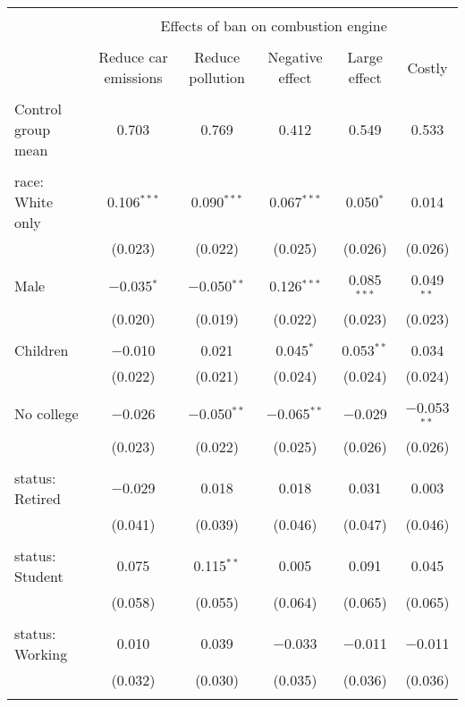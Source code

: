 
\begin{tabular}{@{\extracolsep{5pt}}lccccc} 
\\[-1.8ex]\hline 
\hline \\[-1.8ex] 
 & \multicolumn{5}{c}{Effects of ban on combustion engine} \\ 
\cline{2-6} 
\\[-1.8ex] & Reduce car emissions & Reduce pollution & Negative effect & Large effect & Costly \\ 
\hline \\[-1.8ex] 
 Control group mean & 0.703 & 0.769 & 0.412 & 0.549 & 0.533  \\ \hline \\[-1.8ex] race: White only & 0.106$^{***}$ & 0.090$^{***}$ & 0.067$^{***}$ & 0.050$^{*}$ & 0.014 \\ 
  & (0.023) & (0.022) & (0.025) & (0.026) & (0.026) \\ 
  & & & & & \\ 
 Male & $-$0.035$^{*}$ & $-$0.050$^{**}$ & 0.126$^{***}$ & 0.085$^{***}$ & 0.049$^{**}$ \\ 
  & (0.020) & (0.019) & (0.022) & (0.023) & (0.023) \\ 
  & & & & & \\ 
 Children & $-$0.010 & 0.021 & 0.045$^{*}$ & 0.053$^{**}$ & 0.034 \\ 
  & (0.022) & (0.021) & (0.024) & (0.024) & (0.024) \\ 
  & & & & & \\ 
 No college & $-$0.026 & $-$0.050$^{**}$ & $-$0.065$^{**}$ & $-$0.029 & $-$0.053$^{**}$ \\ 
  & (0.023) & (0.022) & (0.025) & (0.026) & (0.026) \\ 
  & & & & & \\ 
 status: Retired & $-$0.029 & 0.018 & 0.018 & 0.031 & 0.003 \\ 
  & (0.041) & (0.039) & (0.046) & (0.047) & (0.046) \\ 
  & & & & & \\ 
 status: Student & 0.075 & 0.115$^{**}$ & 0.005 & 0.091 & 0.045 \\ 
  & (0.058) & (0.055) & (0.064) & (0.065) & (0.065) \\ 
  & & & & & \\ 
 status: Working & 0.010 & 0.039 & $-$0.033 & $-$0.011 & $-$0.011 \\ 
  & (0.032) & (0.030) & (0.035) & (0.036) & (0.036) \\ 
  & & & & & \\ 

\end{tabular}
